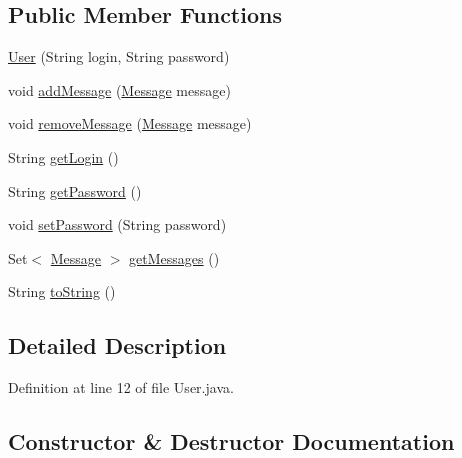 \subsection*{Public Member Functions}
\begin{DoxyCompactItemize}
\item 
\mbox{\hyperlink{classes_1_1deusto_1_1server_1_1jdo_1_1_user_aff10b5126f49ceda0cb6af2b29909f97}{User}} (String login, String password)
\item 
void \mbox{\hyperlink{classes_1_1deusto_1_1server_1_1jdo_1_1_user_ad1e6a51cbfe6bfa62475b0789426ceb6}{add\+Message}} (\mbox{\hyperlink{classes_1_1deusto_1_1server_1_1jdo_1_1_message}{Message}} message)
\item 
void \mbox{\hyperlink{classes_1_1deusto_1_1server_1_1jdo_1_1_user_af83c1484fccb51d9977e0be6b3552562}{remove\+Message}} (\mbox{\hyperlink{classes_1_1deusto_1_1server_1_1jdo_1_1_message}{Message}} message)
\item 
String \mbox{\hyperlink{classes_1_1deusto_1_1server_1_1jdo_1_1_user_aad8107ea8f9281199377f705d541bf8e}{get\+Login}} ()
\item 
String \mbox{\hyperlink{classes_1_1deusto_1_1server_1_1jdo_1_1_user_a1900ee126da22ed0f043e0077e8be049}{get\+Password}} ()
\item 
void \mbox{\hyperlink{classes_1_1deusto_1_1server_1_1jdo_1_1_user_a2e052b5a7cab949f61580edf44bbd233}{set\+Password}} (String password)
\item 
Set$<$ \mbox{\hyperlink{classes_1_1deusto_1_1server_1_1jdo_1_1_message}{Message}} $>$ \mbox{\hyperlink{classes_1_1deusto_1_1server_1_1jdo_1_1_user_a29a7cd0e1f989cbe4d12a2da397d2462}{get\+Messages}} ()
\item 
String \mbox{\hyperlink{classes_1_1deusto_1_1server_1_1jdo_1_1_user_a65366a578a6dcc53e3a77d6eabbbf8cf}{to\+String}} ()
\end{DoxyCompactItemize}


\subsection{Detailed Description}


Definition at line 12 of file User.\+java.



\subsection{Constructor \& Destructor Documentation}
\mbox{\label{classes_1_1deusto_1_1server_1_1jdo_1_1_user_aff10b5126f49ceda0cb6af2b29909f97}} 
